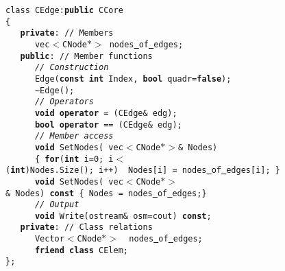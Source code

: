 {
\sffamily \raggedright \scriptsize
\texttt{class\ CEdge:\textbf{public}\ CCore\\
\{\\
\ \ \ \textbf{private}: // Members\\
\ \ \ \ \ \ vec$<${}CNode$\ast>${}\ nodes\underline\ of\underline\ edges;\\
\ \ \ \textbf{public}: // Member functions\\
\ \ \ \ \ \ \textsl{//\ Construction}\\
\ \ \ \ \ \ Edge(\textbf{const}\ \textbf{int}\ Index,\ \textbf{bool}\ quadr=\textbf{false});\\
\ \ \ \ \ \ \textasciitilde Edge();\ \\
\ \ \ \ \ \ \textsl{//\ Operators}\\
\ \ \ \ \ \ \textbf{void}\ \textbf{operator}\ =\ (CEdge\&\ edg);\\
\ \ \ \ \ \ \textbf{bool}\ \textbf{operator}\ ==\ (CEdge\&\ edg);\\
\ \ \ \ \ \ \textsl{//\ Member access}\\
\ \ \ \ \ \ \textbf{void}\ SetNodes(\ vec$<${}CNode$\ast>${}\&\ Nodes)\\
\ \ \ \ \ \ \{\ \textbf{for}(\textbf{int}\ i=0;\ i$<${}(\textbf{int})Nodes.Size();\ i++)\ \ Nodes[i]\ =\ nodes\underline\ of\underline\ edges[i];\ \}\\
\ \ \ \ \ \ \textbf{void}\ SetNodes(\ vec$<${}CNode$\ast>${}\&\ Nodes)\ \textbf{const}\ \{\ Nodes\ =\ nodes\underline\ of\underline\ edges;\}\\
\ \ \ \ \ \ \textsl{//\ Output}\\
\ \ \ \ \ \ \textbf{void}\ Write(ostream\&\ osm=cout)\ \textbf{const};\\
\ \ \ \textbf{private}: // Class relations\\
\ \ \ \ \ \ Vector$<${}CNode$\ast>${}\ \ nodes\underline\ of\underline\ edges;\\
\ \ \ \ \ \ \textbf{friend}\ \textbf{class}\ CElem;\\
\};\\
}
 }
\normalfont\normalsize
